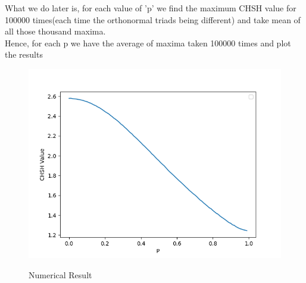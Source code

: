 \documentclass{article}
\begin{document}
  What we do later is, for each value of 'p' we find the maximum CHSH 			value for 100000 times(each time the orthonormal triads being 			different) and take mean of all those thousand maxima.\\
  Hence, for each p we have the average of maxima taken 100000 times
  and plot the results
  \clearpage
 \begin{figure}[b!]
  \includegraphics[width=\linewidth]{better.png}
  \caption*{Numerical Result}
  \label*{}
 \end{figure}
 
\end{document}
